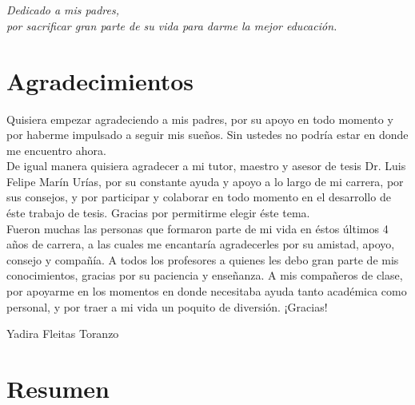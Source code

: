 \documentclass[a4paper,openright,12pt]{report}
\begin{document}
\chapter*{}
\begin{flushright}
\textit{Dedicado a mis padres, \\ por sacrificar gran parte de su vida para darme la mejor educación.\\}
\end{flushright}

\chapter*{Agradecimientos}
Quisiera empezar agradeciendo a mis padres, por su apoyo en todo momento y por haberme impulsado a seguir mis sueños. Sin ustedes no podría estar en donde me encuentro ahora.\\

De igual manera quisiera agradecer a mi tutor, maestro y asesor de tesis Dr. Luis Felipe Marín Urías, por su constante ayuda y apoyo a lo largo de mi carrera, por sus consejos, y por participar y colaborar en todo momento en el desarrollo de éste trabajo de tesis. Gracias por permitirme elegir éste tema.\\

Fueron muchas las personas que formaron parte de mi vida en éstos últimos 4 años de carrera, a las cuales me encantaría agradecerles por su amistad, apoyo, consejo y compañía. A todos los profesores a quienes les debo gran parte de mis conocimientos, gracias por su paciencia y enseñanza. A mis compañeros de clase, por apoyarme en los momentos en donde necesitaba ayuda tanto académica como personal, y por traer a mi vida un poquito de diversión. ¡Gracias!\\
\vspace*{10mm}
 
\hspace*{90mm}Yadira Fleitas Toranzo


\chapter*{Resumen}
\end{document}
